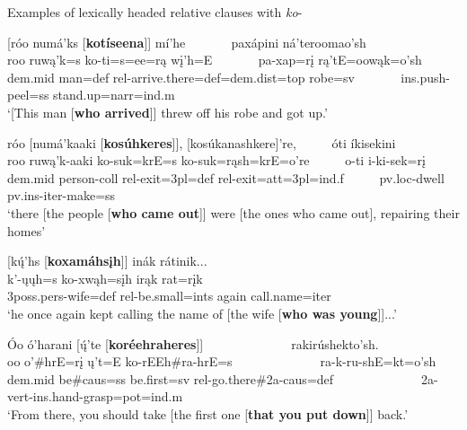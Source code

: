 \begin{exe}
    \item\label{Ch5HeadedRCs} Examples of lexically headed relative clauses with \textit{ko}-

    \begin{xlist}
        \item\label{Ch5HeadedRCsA} \glll \textnormal{[}róo numá'ks \textnormal{[}\textbf{kotíseena}\textnormal{]]} mí'he ~ ~ ~ ~ paxápini ná'teroomao'sh\\
        roo ruwą'k=s ko-ti=s=ee=rą wį'h=E ~ ~ ~ ~ pa-xap=rį rą'tE=oowąk=o'sh\\
        dem.mid \textnormal{man}=def rel-\textnormal{arrive.there}=def=dem.dist=top \textnormal{robe}=sv ~ ~ ~ ~ ins.push-\textnormal{peel}=ss \textnormal{stand.up}=narr=ind.m\\
        \glt `[This man [\textbf{who arrived}]] threw off his robe and got up.' \citep[94]{hollow1973b}

        \item\label{Ch5HeadedRCsB} \glll róo \textnormal{[}numá'kaaki \textnormal{[}\textbf{kosúhkeres}\textnormal{]]}, \textnormal{[}kosúkanashkere\textnormal{]}'re,  ~ ~ ~ óti íkisekini\\
        roo ruwą'k-aaki ko-suk=krE=s ko-suk=rąsh=krE=o're ~ ~ ~ o-ti i-ki-sek=rį\\
        dem.mid \textnormal{person}-coll rel-\textnormal{exit}=3pl=def rel-\textnormal{exit}=att=3pl=ind.f ~ ~ ~ pv.loc-\textnormal{dwell} pv.ins-iter-\textnormal{make}=ss\\
        \glt `there [the people [\textbf{who came out}]] were [the ones who came out], repairing their homes' \citep[198]{trechter2012b}

        \item\label{Ch5HeadedRCsC} \glll \textnormal{[}kų́'hs \textnormal{[}\textbf{koxamáhsįh}\textnormal{]]} inák rátinik...\\
        k'-ųųh=s ko-xwąh=sįh irąk rat=rįk\\
        3poss.pers-\textnormal{wife}=def rel-\textnormal{be.small}=ints \textnormal{again} \textnormal{call.name}=iter\\
        \glt `he once again kept calling the name of [the wife [\textbf{}\textbf{who was young}]]...' \citep[32]{trechter2012b}

        \item\label{Ch5HeadedRCsD} \glll Óo ó'harani \textnormal{[}ų́'te \textnormal{[}\textbf{koréehraheres}\textnormal{]]} ~ ~ ~ ~ ~ ~ ~ ~ rakirúshekto'sh.\\
        oo o'\#hrE=rį ų't=E ko-rEEh\#ra-hrE=s ~ ~ ~ ~ ~ ~ ~ ~ ra-k-ru-shE=kt=o'sh\\
        dem.mid \textnormal{be}\#caus=ss \textnormal{be.first}=sv rel-\textnormal{go.there}\#2a-caus=def ~ ~ ~ ~ ~ ~ ~ ~ 2a-vert-ins.hand-\textnormal{grasp}=pot=ind.m\\
        \glt `From there, you should take [the first one [\textbf{that you put down}]] back.' \citep[228]{hollow1973b}


\end{xlist}
\end{exe}
